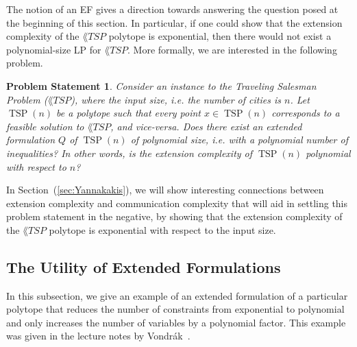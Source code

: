 \documentclass{article}
\newtheorem{probstate}[theorem]{\sc Problem Statement}
\theoremstyle{definition}
\theoremstyle{remark}
\newcommand{\TSP}{\operatorname{TSP}}
\begin{document}
The notion of an EF gives a direction towards answering the question posed at the beginning of this section. In particular, if one could show that the extension complexity of the $\lang{TSP}$ polytope is exponential, then there would not exist a polynomial-size LP for $\lang{TSP}$. More formally, we are interested in the following problem.

\begin{probstate}
Consider an instance to the Traveling Salesman Problem ($\lang{TSP}$), where the input size, i.e. the number of cities is $n$. Let $\TSP(n)$ be a polytope such that every point $x \in \TSP(n)$ corresponds to a feasible solution to $\lang{TSP}$, and vice-versa. Does there exist an extended formulation $Q$ of $\TSP(n)$ of polynomial size, i.e. with a polynomial number of inequalities? In other words, is the extension complexity of $\TSP(n)$ polynomial with respect to $n$?
\end{probstate}

In Section~(\ref{sec:Yannakakis}), we will show interesting connections between extension complexity and communication complexity that will aid in settling this problem statement in the negative, by showing that the extension complexity of the $\lang{TSP}$ polytope is exponential with respect to the input size.

\subsection{The Utility of Extended Formulations}\label{sec:utility-EF}

In this subsection, we give an example of an extended formulation of a particular polytope that reduces the number of constraints from exponential to polynomial and only increases the number of variables by a polynomial factor. This example was given in the lecture notes by Vondr\'ak~\cite{vondrak-class}.
\end{document}
